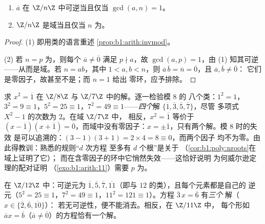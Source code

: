 \begin{theorem}[$\Z/n\Z$ 的可逆元；域 $\Z/p\Z$]\label{thm:b1:structures:zp}
\begin{enumerate}
  \item $\overline a$ 在 $\Z/n\Z$ 中可逆当且仅当
        $\gcd(a, n) = 1$。
  \item $\Z/n\Z$ 是域当且仅当 $n$ 为。
\end{enumerate}
\end{theorem}

\begin{proof}
(1) 即用类的语言重述 \cref{prop:b1:arith:invmod}。

(2) 若 $n = p$ 为，则每个 $\overline a \neq \overline 0$ 满足 $p
\nmid a$，故 $\gcd(a, p) = 1$，由 (1) 知其可逆——从而是域。若 $n =
ab$，其中 $1 < a, b < n$，则 $\overline a\, \overline b = \overline
n = \overline 0$，且 $\overline a, \overline b \neq \overline 0$：
它们是零因子，故甚至不是；而 $n = 1$ 给出
零环，应予排除。
\end{proof}

\begin{example}[$1$ 有几个平方根？]\label{ex:b1:structures:sqrtone}
求 $x^2 = \overline 1$ 在 $\Z/8\Z$ 与 $\Z/7\Z$ 中的解。逐一检验模 $8$ 的
八个类：$1^2 = 1$，$3^2 = 9 \equiv 1$，$5^2 = 25
\equiv 1$，$7^2 = 49 \equiv 1$——\emph{四个}解
$\{\overline1, \overline3, \overline5, \overline7\}$，尽管
多项式 $X^2 - 1$ 的次数为 $2$。在域 $\Z/7\Z$ 中，
相反，$x^2 = \overline1$ 等价于 $(x - \overline1)(x +
\overline1) = \overline0$，而域中没有零因子：$x =
\pm\overline1$，只有两个解。模 $8$ 时的失效
是可以追溯的：$(3-1)(3+1) = 2 \times 4 = 8 \equiv 0$，而两个因子
均不为零。由此得教训：熟悉的规则“$d$ 次方程
至多有 $d$ 个根”是关于
\emph{}（\cref{cor:b1:poly:nroots}在域上证明了它）；
而在含零因子的环中它悄然失效——这恰好说明
为何威尔逊定理的配对证明
（\cref{exo:b1:arith:11}）需要 $p$ 为。
\end{example}

\begin{example}[在 $\Z/n\Z$ 中计算]\label{ex:b1:structures:zncomputation}
在 $\Z/12\Z$ 中：可逆元为 $\overline 1, \overline 5, \overline 7,
\overline{11}$（即与 $12$ 的类），且每个元素都是自己的
逆元（$5^2 = 25 \equiv 1$，$7^2 = 49 \equiv 1$，$11^2 = 121 \equiv
1$）。方程 $\overline 3\, x = \overline 6$ 有\emph{三个}
解（$x \in \{\overline 2, \overline 6, \overline{10}\}$）：
若无可逆性，便不能消去。相反，在 $\Z/11\Z$ 中，
每个形如 $\overline a x = \overline b$（$\overline a \neq
\overline 0$）的方程恰有一个解。
\end{example}

